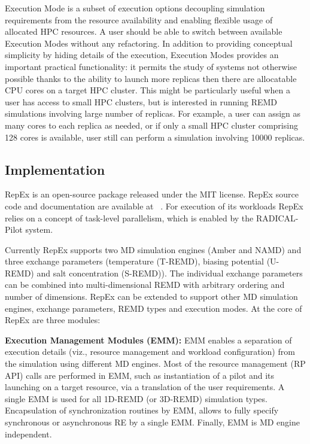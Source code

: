 \documentclass{sig-alternate-05-2015}
\begin{document}
Execution Mode is a subset of execution options decoupling simulation requirements from the resource availability and enabling flexible usage of allocated HPC resources.  A user should be able to switch between available Execution Modes without any refactoring.  In addition to providing conceptual simplicity by hiding details of the execution, Execution Modes provides an important practical functionality: it permits the study of systems not otherwise possible thanks to the ability to launch more replicas then there are allocatable CPU cores on a target HPC cluster. This might be particularly useful when a user has access to small HPC clusters, but is interested in running REMD simulations involving large number of replicas. For example, a user can assign as many cores to each replica as needed, or if only a small HPC cluster comprising 128 cores is available, user still can perform a simulation involving 10000 replicas.

\subsection{Implementation} \label{implementation}

RepEx is an open-source package released under the MIT license. RepEx source code and documentation are available at ~\cite{repex-code}. For execution of its workloads RepEx relies on a concept of task-level parallelism, which is enabled by the RADICAL-Pilot system.

Currently RepEx supports two MD simulation engines (Amber and NAMD) and three exchange parameters (temperature (T-REMD), biasing potential (U-REMD) and salt concentration (S-REMD)).  The individual exchange parameters can be combined into multi-dimensional REMD with arbitrary ordering and number of dimensions. RepEx can be extended to support other MD simulation engines, exchange parameters, REMD types and execution modes.  At the core of RepEx are three modules:

{\bf Execution Management Modules (EMM):} EMM enables a separation of execution details (viz., resource management and workload configuration) from the simulation using different MD engines. Most of the resource management (RP API) calls are performed in EMM, such as instantiation of a pilot and its launching on a target resource, via a translation of the user requirements. A single EMM is used for all 1D-REMD (or 3D-REMD) simulation types. Encapsulation of synchronization routines by EMM, allows to fully specify synchronous or asynchronous RE by a single EMM. Finally, EMM is MD engine independent.
\end{document}
